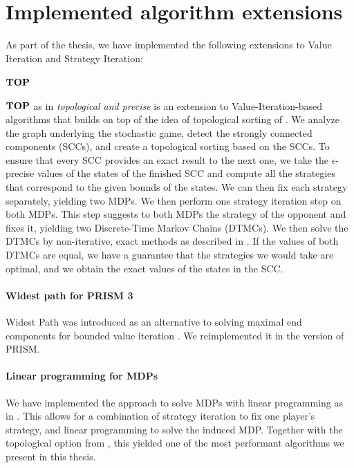 \chapter{Implemented algorithm extensions} \label{ch:implementedAlgos}
As part of the thesis, we have implemented the following extensions to Value Iteration and Strategy Iteration:

\subsubsection*{$\mathbf{TOP}$} $\mathbf{TOP}$ as in \emph{topological and precise} is an extension to Value-Iteration-based algorithms that builds on top of the idea of topological sorting of \cite{Gandalf}.
We analyze the graph underlying the stochastic game, detect the strongly connected components (SCCs), and create a topological sorting based on the SCCs.
To ensure that every SCC provides an exact result to the next one, we take the $\epsilon$-precise values of the states of the finished SCC and compute all the
strategies that correspond to the given bounds of the states.
We can then fix each strategy separately, yielding two MDPs. We then perform one strategy iteration step on both MDPs. This step suggests to both MDPs the strategy
of the opponent and fixes it, yielding two Discrete-Time Markov Chains (DTMCs). We then solve the DTMCs by non-iterative, exact methods as described in \cite{BaierBook}.
If the values of both DTMCs are equal, we have a guarantee that the strategies we would take are optimal, and we obtain the exact values of the states in the SCC.

\subsubsection*{Widest path for PRISM 3}
Widest Path was introduced as an alternative to solving maximal end components for bounded value iteration \cite*{WidestPath}.
We reimplemented it in the version of PRISM.

\subsubsection*{Linear programming for MDPs}
We have implemented the approach to solve MDPs with linear programming as in \cite{ANY BOOK}. 
This allows for a combination of strategy iteration to fix one player's strategy, and linear programming to solve the induced MDP.
Together with the topological option from \cite{GANDALF}, this yielded one of the most performant algorithms we present in this thesis.